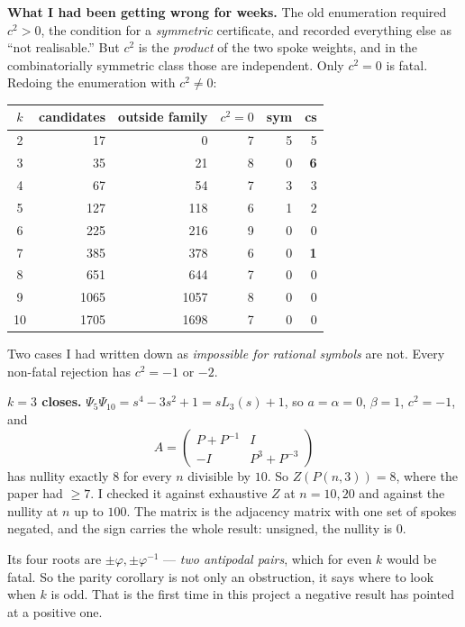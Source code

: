 \documentclass[12pt]{article}
\begin{document}
\textbf{What I had been getting wrong for weeks.} The old enumeration required
$c^{2}>0$, the condition for a \emph{symmetric} certificate, and recorded
everything else as ``not realisable.'' But $c^{2}$ is the \emph{product} of the
two spoke weights, and in the combinatorially symmetric class those are
independent. Only $c^{2}=0$ is fatal. Redoing the enumeration with $c^{2}\ne0$:

\begin{center}\small
\begin{tabular}{crrrrr}
\toprule
$k$ & candidates & outside family & $c^{2}=0$ & sym & cs \\
\midrule
2 & 17 & 0 & 7 & 5 & 5 \\
3 & 35 & 21 & 8 & 0 & \textbf{6} \\
4 & 67 & 54 & 7 & 3 & 3 \\
5 & 127 & 118 & 6 & 1 & 2 \\
6 & 225 & 216 & 9 & 0 & 0 \\
7 & 385 & 378 & 6 & 0 & \textbf{1} \\
8 & 651 & 644 & 7 & 0 & 0 \\
9 & 1065 & 1057 & 8 & 0 & 0 \\
10 & 1705 & 1698 & 7 & 0 & 0 \\
\bottomrule
\end{tabular}
\end{center}

\noindent
Two cases I had written down as \emph{impossible for rational symbols} are not.
Every non-fatal rejection has $c^{2}=-1$ or $-2$.

\textbf{$k=3$ closes.} $\Psi_5\Psi_{10}=s^{4}-3s^{2}+1=sL_3(s)+1$, so
$a=\alpha=0$, $\beta=1$, $c^{2}=-1$, and
\[
  A=\begin{pmatrix} P+P^{-1} & I\\ -I & P^{3}+P^{-3}\end{pmatrix}
\]
has nullity exactly $8$ for every $n$ divisible by $10$. So $Z(P(n,3))=8$,
where the paper had $\ge7$. I checked it against exhaustive $Z$ at $n=10,20$
and against the nullity at $n$ up to $100$. The matrix is the adjacency matrix
with one set of spokes negated, and the sign carries the whole result: unsigned,
the nullity is $0$.

Its four roots are $\pm\varphi,\pm\varphi^{-1}$ --- \emph{two antipodal pairs},
which for even $k$ would be fatal. So the parity corollary is not only an
obstruction, it says where to look when $k$ is odd. That is the first time in
this project a negative result has pointed at a positive one.
\end{document}

